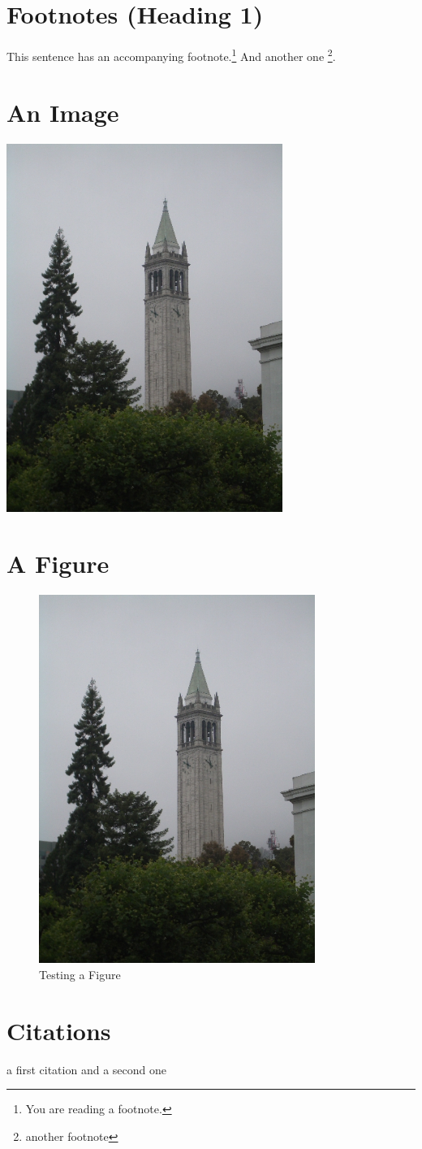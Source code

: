 \documentclass{article}
\begin{document}
\section{Footnotes (Heading 1)}

This sentence has an accompanying footnote.\footnote{You are reading a footnote.}   And
another one \footnote{another footnote}. 

\section{An Image}
 \includegraphics[width=9cm]{campanile_fog}

\section{A Figure}

\begin{figure}[ht]
  \includegraphics[width=9cm]{campanile_fog}
  \caption{Testing a Figure}
\end{figure}

\section{Citations}
a first citation \cite{aaa} and a second one \cite{bbb}


\end{document}
